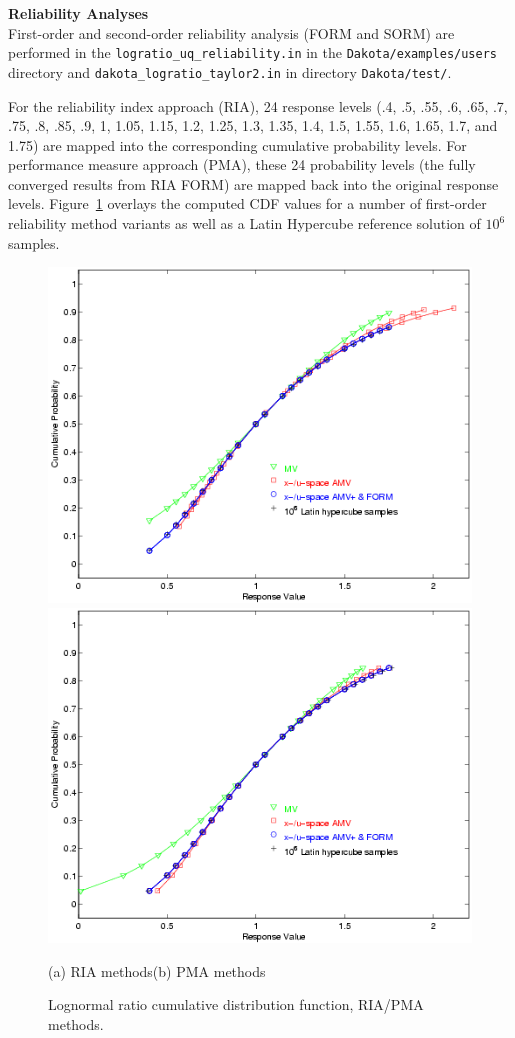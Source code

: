 {\bf Reliability Analyses} \\

First-order and second-order reliability analysis (FORM and SORM) are performed in the
\texttt{logratio\_uq\_reliability.in} in the {\tt Dakota/examples/users}
 directory and \texttt{dakota\_logratio\_taylor2.in} in directory 
{\tt Dakota/test/}. 

For the reliability index approach (RIA),
24 response levels (.4, .5, .55,
.6, .65, .7, .75, .8, .85, .9, 1, 1.05, 1.15, 1.2, 1.25, 1.3, 1.35,
1.4, 1.5, 1.55, 1.6, 1.65, 1.7, and 1.75) are mapped into the
corresponding cumulative probability levels. For performance measure approach (PMA), these 24
probability levels (the fully converged results from RIA FORM) are
mapped back into the original response levels.
Figure~\ref{fig:log_ratio_cdf} overlays the computed CDF values for a
number of first-order reliability method variants as well as a Latin
Hypercube reference solution of $10^6$ samples.
\begin{figure}[hbp]
\centering
\centerline{\includegraphics[scale=0.5]{images/log_ratio_cdf_ria}
            \includegraphics[scale=0.5]{images/log_ratio_cdf_pma}}
(a) RIA methods\hspace{2.5in}(b) PMA methods
\caption{Lognormal ratio cumulative distribution function, RIA/PMA methods.}
\label{fig:log_ratio_cdf}
\end{figure}

